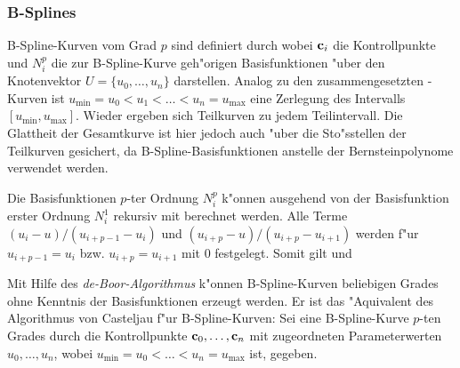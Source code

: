 %
%

\subsubsection{B-Splines}
\label{spline}
B-Spline-Kurven vom Grad $p$ sind definiert durch
wobei ${ \bf c}_i$ die Kontrollpunkte und $N_i^p$ die zur B-Spline-Kurve 
geh"origen Basisfunktionen "uber den Knotenvektor $U = \{u_0, \dots, u_n\}$ 
darstellen. Analog zu den zusammengesetzten \bez-Kurven ist $u_{\min} = u_0 < 
u_1 < \dots < u_n = u_{\max}$ eine Zerlegung des Intervalls $[u_{\min}, 
u_{\max}]$. 
Wieder ergeben sich Teilkurven zu jedem Teilintervall. Die Glattheit der 
Gesamtkurve ist hier jedoch auch "uber die Sto"sstellen der Teilkurven 
gesichert, da B-Spline-Basisfunktionen anstelle der Bernsteinpolynome 
verwendet werden. 

Die Basisfunktionen $p$-ter Ordnung $N_i^p$ k"onnen ausgehend von der 
Basisfunktion erster Ordnung $N_i^1$
rekursiv mit
berechnet werden. 
Alle Terme $(u_i-u)/(u_{i+p-1}-u_i)$ und $(u_{i+p}-u)/(u_{i+p}-u_{i+1})$ 
werden f"ur $u_{i+p-1}=u_i$ bzw. $u_{i+p}=u_{i+1}$ mit $0$ festgelegt.
Somit gilt 
und

Mit Hilfe des \emph{de-Boor-Algorithmus} k"onnen B-Spline-Kurven beliebigen 
Grades ohne Kenntnis der Basisfunktionen erzeugt werden. Er ist das 
"Aquivalent des Algorithmus von Casteljau f"ur B-Spline-Kurven:
Sei eine B-Spline-Kurve $p$-ten Grades durch die Kontrollpunkte 
${\bf c}_0, \dots, {\bf c}_n$ mit zugeordneten Parameterwerten 
$u_0, \dots, u_n$, wobei $u_{\min} = u_0 < \dots < u_n = u_{\max}$ ist, 
gegeben. 


